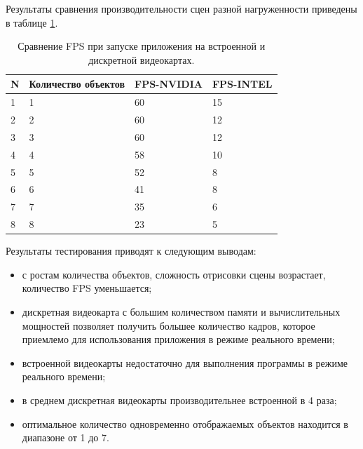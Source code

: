 Результаты сравнения производительности сцен разной нагруженности приведены в таблице \ref{tb:comp_fps}.
\begin{table}[]
  \label{tb:comp_fps}
  \caption{Сравнение FPS при запуске приложения на встроенной и дискретной видеокартах.}
  \begin{tabular}{|l|l|l|l|}
  \hline
  N & Количество объектов & FPS-NVIDIA & FPS-INTEL \\
  \hline
  1 & 1                   & 60         & 15        \\
  2 & 2                   & 60         & 12        \\
  3 & 3                   & 60         & 12        \\
  4 & 4                   & 58         & 10        \\
  5 & 5                   & 52         & 8         \\
  6 & 6                   & 41         & 8         \\
  7 & 7                   & 35         & 6         \\
  8 & 8                   & 23         & 5        \\
  \hline
  \end{tabular}
\end{table}

Результаты тестирования приводят к следующим выводам:
\begin{itemize}
  \item с ростам количества объектов, сложность отрисовки сцены возрастает, количество FPS уменьшается;
  \item дискретная видеокарта с большим количеством памяти и вычислительных мощностей позволяет получить большее количество кадров, которое приемлемо для использования приложения в режиме реального времени;
  \item встроенной видеокарты недостаточно для выполнения программы в режиме реального времени;
  \item в среднем дискретная видеокарты производительнее встроенной в 4 раза;
  \item оптимальное количество одновременно отображаемых объектов находится в диапазоне от 1 до 7.
\end{itemize}




